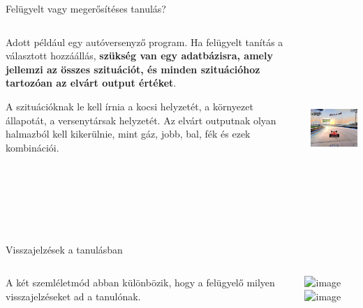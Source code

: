 \documentclass[english, aspectratio=169]{beamer}
\begin{document}
\begin{frame}{Felügyelt vagy megerősítéses tanulás?}
\begin{columns}
\begin{column}{.5\textwidth}
Adott például egy autóversenyző program. Ha felügyelt tanítás a választott hozzáállás, \textbf{szükség van egy adatbázisra, amely jellemzi az összes szituációt, és minden szituációhoz tartozóan az elvárt output értéket}.\par\medskip
A szituációknak le kell írnia a kocsi helyzetét, a környezet állapotát, a versenytársak helyzetét. Az elvárt outputnak olyan halmazból kell kikerülnie, mint gáz, jobb, bal, fék és ezek kombinációi.
\end{column}
\begin{column}{.5\textwidth}
\begin{center}
\includegraphics[width=6cm, height=7cm, keepaspectratio]{images/reinforcement_6.png}
\end{center}
\end{column}
\end{columns}
\end{frame}

\begin{frame}{Visszajelzések a  tanulásban}
\begin{columns}
\begin{column}{.5\textwidth}
A két szemléletmód abban különbözik, hogy a felügyelő milyen visszajelzéseket ad a tanulónak.\par\medskip
{}
\end{column}
\begin{column}{.5\textwidth}
\begin{center}
\includegraphics<1>[width=7cm, height=7cm, keepaspectratio]{graphs/reinforcement_1.png}
\includegraphics<2>[width=7cm, height=7cm, keepaspectratio]{graphs/reinforcement_2.png}
\end{center}
\end{column}
\end{columns}
\end{frame}
\end{document}
